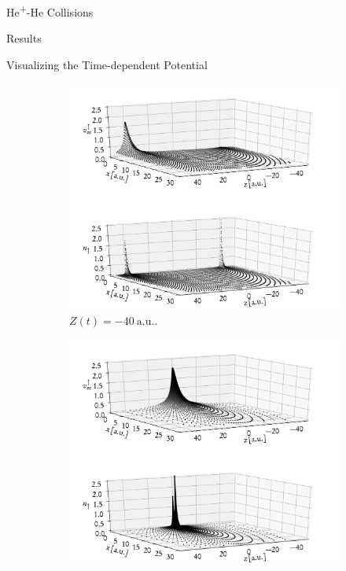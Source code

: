 \documentclass[letterpaper, 11 pt]{report}
\begin{document}
\begin{chapter}{\texorpdfstring{He\textsuperscript{+}}{He+}-He Collisions \label{chap:hephe}}
\begin{section}{Results \label{sec:hephe-disc}}
\begin{subsection}{Visualizing the Time-dependent Potential \label{sec:visual}}
         \begin{figure}[t]
            \centering
            \begin{subfigure}{.49\textwidth}
               \centering
               \includegraphics[width=\linewidth]{./images/frames/vee-up-E50-b1-initial.pdf}
               \caption{$Z(t) = -40~\mathrm{a.u.}$. \label{fig:upI}}
            \end{subfigure}
            \begin{subfigure}{.49\textwidth}
               \centering
               \includegraphics[width=\linewidth]{./images/frames/vee-up-E50-b1-closest.pdf}

\end{subfigure}
\end{figure}
\end{subsection}
\end{section}
\end{chapter}
\end{document}
